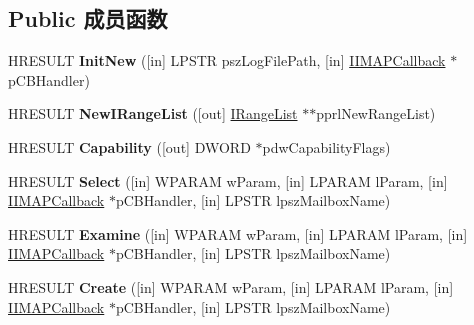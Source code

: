 \subsection*{Public 成员函数}
\begin{DoxyCompactItemize}
\item 
\mbox{\label{class_i_i_m_a_p_transport_a1140a53656d96518fc08e86a36f1e000}} 
H\+R\+E\+S\+U\+LT {\bfseries Init\+New} (\mbox{[}in\mbox{]} L\+P\+S\+TR psz\+Log\+File\+Path, \mbox{[}in\mbox{]} \hyperlink{interface_i_i_m_a_p_callback}{I\+I\+M\+A\+P\+Callback} $\ast$p\+C\+B\+Handler)
\item 
\mbox{\label{class_i_i_m_a_p_transport_a10b2232b3cd6570905e03aae6c083232}} 
H\+R\+E\+S\+U\+LT {\bfseries New\+I\+Range\+List} (\mbox{[}out\mbox{]} \hyperlink{interface_i_range_list}{I\+Range\+List} $\ast$$\ast$pprl\+New\+Range\+List)
\item 
\mbox{\label{class_i_i_m_a_p_transport_a5c0521b23479e32e3ee994fbfb14cf4f}} 
H\+R\+E\+S\+U\+LT {\bfseries Capability} (\mbox{[}out\mbox{]} D\+W\+O\+RD $\ast$pdw\+Capability\+Flags)
\item 
\mbox{\label{class_i_i_m_a_p_transport_a7904bf4aa1855af631189527b54cdd95}} 
H\+R\+E\+S\+U\+LT {\bfseries Select} (\mbox{[}in\mbox{]} W\+P\+A\+R\+AM w\+Param, \mbox{[}in\mbox{]} L\+P\+A\+R\+AM l\+Param, \mbox{[}in\mbox{]} \hyperlink{interface_i_i_m_a_p_callback}{I\+I\+M\+A\+P\+Callback} $\ast$p\+C\+B\+Handler, \mbox{[}in\mbox{]} L\+P\+S\+TR lpsz\+Mailbox\+Name)
\item 
\mbox{\label{class_i_i_m_a_p_transport_adc98cbf14a676270948ff6e7fe3b7db5}} 
H\+R\+E\+S\+U\+LT {\bfseries Examine} (\mbox{[}in\mbox{]} W\+P\+A\+R\+AM w\+Param, \mbox{[}in\mbox{]} L\+P\+A\+R\+AM l\+Param, \mbox{[}in\mbox{]} \hyperlink{interface_i_i_m_a_p_callback}{I\+I\+M\+A\+P\+Callback} $\ast$p\+C\+B\+Handler, \mbox{[}in\mbox{]} L\+P\+S\+TR lpsz\+Mailbox\+Name)
\item 
\mbox{\label{class_i_i_m_a_p_transport_ae30c9697bc6596f7e6151c73bdf496c3}} 
H\+R\+E\+S\+U\+LT {\bfseries Create} (\mbox{[}in\mbox{]} W\+P\+A\+R\+AM w\+Param, \mbox{[}in\mbox{]} L\+P\+A\+R\+AM l\+Param, \mbox{[}in\mbox{]} \hyperlink{interface_i_i_m_a_p_callback}{I\+I\+M\+A\+P\+Callback} $\ast$p\+C\+B\+Handler, \mbox{[}in\mbox{]} L\+P\+S\+TR lpsz\+Mailbox\+Name)
$$
\end{DoxyCompactItemize}
